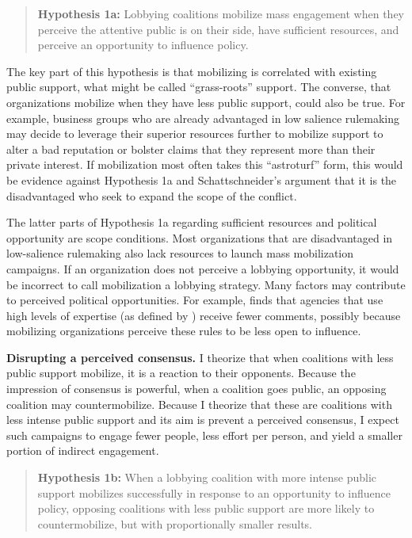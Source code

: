 \documentclass[
      12pt,
        ]{article}
\begin{document}
\begin{quote}
\textbf{Hypothesis 1a:} Lobbying coalitions
mobilize mass engagement when they perceive the attentive public is on
their side, have sufficient resources, and perceive an opportunity to
influence policy.
\end{quote}

The key part of this hypothesis is that mobilizing is correlated with
existing public support, what might be called ``grass-roots'' support. The
converse, that organizations mobilize when they have less public
support, could also be true. For example, business groups who are
already advantaged in low salience rulemaking may decide to leverage
their superior resources further to mobilize support to alter a bad
reputation or bolster claims that they represent more than their private
interest. If mobilization most often takes this ``astroturf'' form, this
would be evidence against
Hypothesis 1a and Schattschneider's argument that it is the
disadvantaged who seek to expand the scope of the conflict.

The latter parts of Hypothesis 1a regarding sufficient resources and political
opportunity are scope conditions. Most organizations that are
disadvantaged in low-salience rulemaking also lack resources to launch
mass mobilization campaigns. If an organization does not perceive a
lobbying opportunity, it would be incorrect to call mobilization a
lobbying strategy. Many factors may contribute to perceived political
opportunities. For example, \citet{Moore2017} finds that agencies that use high
levels of expertise (as defined by \citet{Selin2015}) receive fewer comments,
possibly because mobilizing organizations perceive these rules to be
less open to influence.

\textbf{Disrupting a perceived consensus.} I theorize that when coalitions
with less public support mobilize, it is a reaction to their opponents.
Because the impression of consensus is powerful, when a coalition goes
public, an opposing coalition may countermobilize. Because I theorize
that these are coalitions with less intense public support and its aim
is prevent a perceived consensus, I expect such campaigns to engage
fewer people, less effort per person, and yield a smaller portion of
indirect engagement.



\begin{quote}
\textbf{Hypothesis 1b:} When a lobbying
coalition with more intense public support mobilizes successfully in
response to an opportunity to influence policy, opposing coalitions with
less public support are more likely to countermobilize, but with
proportionally smaller results.
\end{quote}
\end{document}
